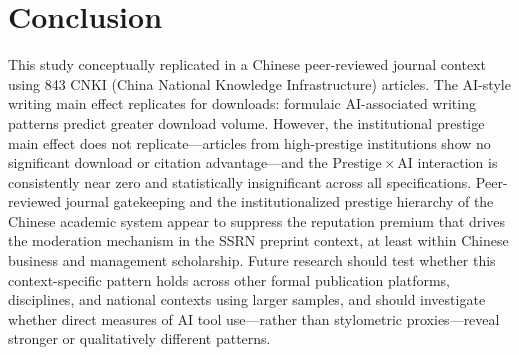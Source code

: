 \documentclass[12pt,a4paper]{article}
\begin{document}
\section{Conclusion}
\label{sec:conclusion}

This study conceptually replicated \citet{JoLi2026} in a Chinese
peer-reviewed journal context using 843 CNKI
(China National Knowledge Infrastructure) articles.
The AI-style writing main effect replicates for downloads: formulaic
AI-associated writing patterns predict greater download volume.
However, the institutional prestige main effect does not replicate---articles
from high-prestige institutions show no significant download or citation
advantage---and the Prestige\,$\times$\,AI interaction is consistently
near zero and statistically insignificant across all specifications.
Peer-reviewed journal gatekeeping and the institutionalized prestige
hierarchy of the Chinese academic system appear to suppress the
reputation premium that drives the moderation mechanism in the SSRN
preprint context, at least within Chinese business and management scholarship.
Future research should test whether this context-specific pattern holds
across other formal publication platforms, disciplines, and national
contexts using larger samples, and should investigate whether direct
measures of AI tool use---rather than stylometric proxies---reveal
stronger or qualitatively different patterns.
\end{document}

